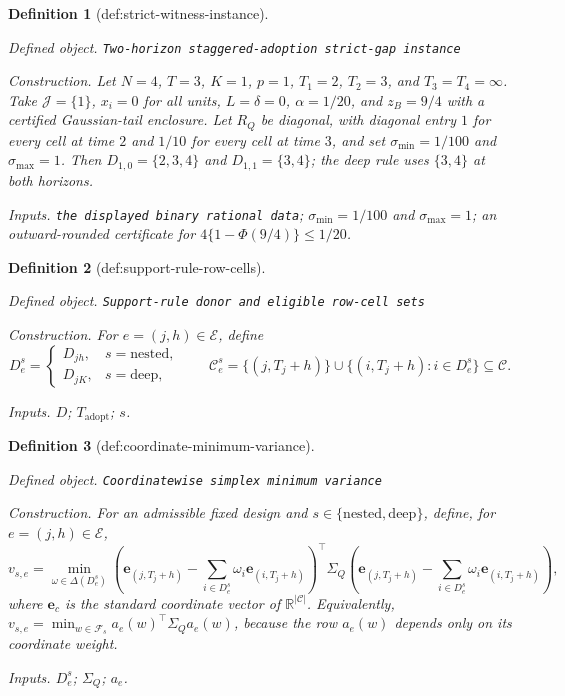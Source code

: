 \documentclass{article}
\newtheorem{definition}{Definition}
\begin{document}
\begin{definition}[def:strict-witness-instance]\label{def:strict-witness-instance}
\par\smallskip\noindent\emph{Defined object.} \texttt{Two-\allowbreak{}horizon staggered-\allowbreak{}adoption strict-\allowbreak{}gap instance}
\par\smallskip\noindent\emph{Construction.} Let \(N=4\), \(T=3\), \(K=1\), \(p=1\), \(T_1=2\), \(T_2=3\), and
\(T_3=T_4=\infty\).  Take \(\mathcal J=\{1\}\), \(x_i=0\) for all units,
\(L=\delta=0\), \(\alpha=1/20\), and \(z_B=9/4\) with a certified
Gaussian-tail enclosure.  Let \(R_Q\) be diagonal, with diagonal entry \(1\)
for every cell at time \(2\) and \(1/10\) for every cell at time \(3\), and
set \(\sigma_{\min}=1/100\) and \(\sigma_{\max}=1\).  Then
\(D_{1,0}=\{2,3,4\}\) and \(D_{1,1}=\{3,4\}\); the deep rule uses
\(\{3,4\}\) at both horizons.
\par\smallskip\noindent\emph{Inputs.} \texttt{the displayed binary rational data}; \(\sigma_{\min}=1/100\) and \(\sigma_{\max}=1\); an outward-rounded certificate for \(4\{1-\Phi(9/4)\}\leq1/20\).
\end{definition}

\begin{definition}[def:support-rule-row-cells]\label{def:support-rule-row-cells}
\par\smallskip\noindent\emph{Defined object.} \texttt{Support-\allowbreak{}rule donor and eligible row-\allowbreak{}cell sets}
\par\smallskip\noindent\emph{Construction.} For \(e=(j,h)\in\mathcal E\), define
\[
 D^s_e=
 \begin{cases}
 D_{jh},&s=\mathrm{nested},\\
 D_{jK},&s=\mathrm{deep},
 \end{cases}
 \qquad
 \mathcal C^s_e=
 \{(j,T_j+h)\}\cup\{(i,T_j+h):i\in D^s_e\}\subseteq\mathcal C.
\]
\par\smallskip\noindent\emph{Inputs.} \(D\); \(T_{\mathrm{adopt}}\); \(s\).
\end{definition}

\begin{definition}[def:coordinate-minimum-variance]\label{def:coordinate-minimum-variance}
\par\smallskip\noindent\emph{Defined object.} \texttt{Coordinatewise simplex minimum variance}
\par\smallskip\noindent\emph{Construction.} For an admissible fixed design and \(s\in\{\mathrm{nested},\mathrm{deep}\}\),
define, for \(e=(j,h)\in\mathcal E\),
\[
 v_{s,e}=\min_{\omega\in\Delta(D^s_e)}
 \left(\mathbf e_{(j,T_j+h)}-
       \sum_{i\in D^s_e}\omega_i\mathbf e_{(i,T_j+h)}\right)^{\!\top}
 \Sigma_Q
 \left(\mathbf e_{(j,T_j+h)}-
       \sum_{i\in D^s_e}\omega_i\mathbf e_{(i,T_j+h)}\right),
\]
where \(\mathbf e_c\) is the standard coordinate vector of
\(\mathbb R^{|\mathcal C|}\).  Equivalently,
\(v_{s,e}=\min_{w\in\mathcal F_s}a_e(w)^{\top}\Sigma_Qa_e(w)\), because the
row \(a_e(w)\) depends only on its coordinate weight.
\par\smallskip\noindent\emph{Inputs.} \(D^s_e\); \(\Sigma_Q\); \(a_e\).
\end{definition}
\end{document}
